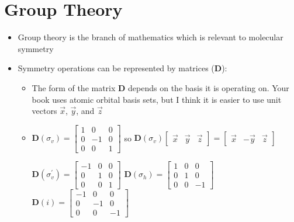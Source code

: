 \documentclass[12pt, openany, letterpaper]{memoir}
\begin{document}
\section{Group Theory}
\begin{itemize}
	\item Group theory is the branch of mathematics which is relevant to molecular symmetry
	\item Symmetry operations can be represented by matrices ($\mathbf{D}$):
	\begin{itemize}
		\item The form of the matrix $\mathbf{D}$ depends on the basis it is operating on. Your book uses atomic orbital basis sets, but I think it is easier to use unit vectors $\vec{x}$, $\vec{y}$, and $\vec{z}$
		\item $ \mathbf{D}(\sigma_v) = 
		\begin{bmatrix}
		1&0&0\\
		0&-1&0\\
		0&0&1
		\end{bmatrix}$ so 
		$ \mathbf{D}(\sigma_v) \begin{bmatrix} \vec{x}&\vec{y}&\vec{z}\end{bmatrix} = \begin{bmatrix} \vec{x}&-\vec{y}&\vec{z}\end{bmatrix}$
		
		$ \mathbf{D}(\sigma_v^{\prime}) = 
		\begin{bmatrix}
		-1&0&0\\
		0&1&0\\
		0&0&1
		\end{bmatrix}$ 
		\hspace{2em} 
		$ \mathbf{D}(\sigma_h) = 
		\begin{bmatrix}
		1&0&0\\
		0&1&0\\
		0&0&-1
		\end{bmatrix}$		
		\hspace{2em} $ \mathbf{D}(i) = 
		\begin{bmatrix}
		-1&0&0\\
		0&-1&0\\
		0&0&-1
		\end{bmatrix}$
		

\end{itemize}
\end{itemize}
\end{document}
